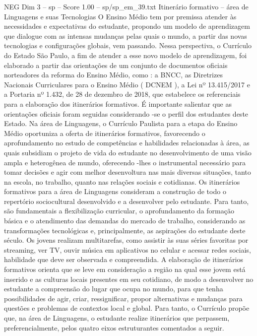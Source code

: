 \begin{textsample}{NEG Dim 3 – sp – Score 1.00 – sp/sp\_em\_39.txt}  \label{ex:f3_neg_086}
Itinerário formativo – área de Linguagens e suas Tecnologias O Ensino Médio tem por premissa atender às necessidades e expectativas do estudante, propondo um modelo de aprendizagem que dialogue com as intensas mudanças pelas quais o mundo, a partir das novas tecnologias e configurações globais, vem passando.
Nessa perspectiva, o Currículo do Estado São Paulo, a fim de atender a esse novo modelo de aprendizagem, foi elaborado a partir das orientações de um conjunto de documentos oficiais norteadores da reforma do Ensino Médio, como : a BNCC, as Diretrizes Nacionais Curriculares para o Ensino Médio ( DCNEM ), a Lei nº 13.415/2017 e a Portaria nº 1.432, de 28 de dezembro de 2018, que estabelece os referenciais para a elaboração dos itinerários formativos.
É importante salientar que as orientações oficiais foram seguidas considerando -se o perfil dos estudantes deste Estado.
Na área de Linguagens, o Currículo Paulista para a etapa do Ensino Médio oportuniza a oferta de itinerários formativos, favorecendo o aprofundamento no estudo de competências e habilidades relacionadas à área, as quais subsidiam o projeto de vida do estudante no desenvolvimento de uma visão ampla e heterogênea de mundo, oferecendo -lhes o instrumental necessário para tomar decisões e agir com melhor desenvoltura nas mais diversas situações, tanto na escola, no trabalho, quanto nas relações sociais e cotidianas.
Os itinerários formativos para a área de Linguagens consideram a construção de todo o repertório sociocultural desenvolvido e a desenvolver pelo estudante.
Para tanto, são fundamentais a flexibilização curricular, o aprofundamento da formação básica e o atendimento das demandas do mercado de trabalho, considerando as transformações tecnológicas e, principalmente, as aspirações do estudante deste século.
Os jovens realizam multitarefas, como assistir às suas séries favoritas por streaming, ver TV, ouvir música em aplicativos no celular e acessar redes sociais, habilidade que deve ser observada e compreendida.
A elaboração de itinerários formativos orienta que se leve em consideração a região na qual esse jovem está inserido e as culturas locais presentes em seu cotidiano, de modo a desenvolver no estudante a compreensão do lugar que ocupa no mundo, para que tenha possibilidades de agir, criar, ressignificar, propor alternativas e mudanças para questões e problemas de contextos local e global.
Para tanto, o Currículo propõe que, na área de Linguagens, o estudante realize itinerários que perpassem, preferencialmente, pelos quatro eixos estruturantes comentados a seguir.

\end{textsample}
